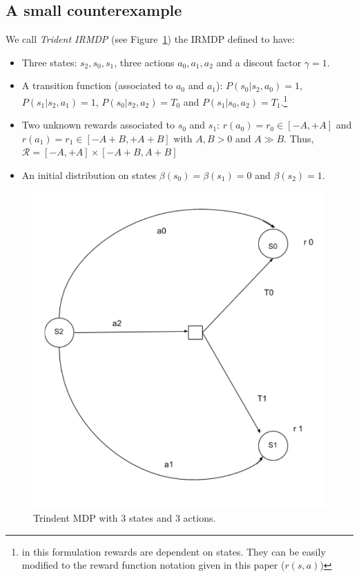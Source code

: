 \subsection{A small counterexample}\label{sec:counter}

We call \textit{Trident IRMDP} (see Figure~\ref{fig:trident}) the IRMDP defined to have:
\begin{itemize}
\item Three states: $s_2, s_0, s_1$, three actions $a_0, a_1, a_2$ and a discout factor $\gamma=1$.
\item A transition function (associated to $a_0$ and $a_1$): $P(s_0 | s_2,a_0)=1$, $P(s_1 |s_2 ,a_1)=1$, $P(s_0 | s_2, a_2) = T_0$ and $P(s_1 | s_0, a_2) = T_1$.\footnote{in this formulation rewards are dependent on states. They can be easily modified to the reward function notation given in this paper ($r(s, a)$)} 	 
\item Two unknown rewards associated to $s_0$ and $s_1$: $r(a_0)= r_0 \in [-A,+A]$ and $r(a_1)= r_1 \in [-A+B,+A+B]$ with $A,B > 0$ and $A \gg B$. Thus, $\mathcal{R} = [-A, +A]\times[-A+B, A+B]$
\item An initial distribution on states $\beta(s_0)= \beta(s_1) = 0$ and $\beta(s_2)=1$.

\end{itemize} 

\begin{figure}[]
	\begin{center}
    \includegraphics[scale=0.4]{images/Trident_MDP.pdf}
	\end{center}
	\caption{Trindent MDP with $3$ states and $3$ actions.}
	\label{fig:trident} 
\end{figure}

